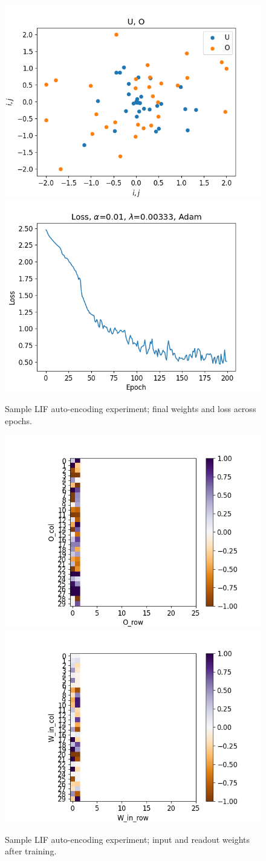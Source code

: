\documentclass[mphil,deptreport,ianc]{infthesis} %
\begin{document}
\begin{figure}[!h]
    \centering
    \includegraphics[width=0.49\columnwidth]{figures/Supplementary/gating/LIF/AutoEncoding/01-04_16-35-37-680/_weights_O_U.png}
    \includegraphics[width=0.49\columnwidth]{figures/Supplementary/gating/LIF/AutoEncoding/01-04_16-35-37-680/plot_loss_test_mt_LIF_et_AutoEncoding_N_30_titers_200.png}
    \caption{Sample LIF auto-encoding experiment; final weights and loss across epochs.}
    \label{fig:LIF_AE_1_w_loss}
\end{figure}

\begin{figure}[!h]
    \centering
    \includegraphics[width=0.49\columnwidth]{figures/Supplementary/gating/LIF/AutoEncoding/01-04_16-35-37-680/test_heatmap_2_O_T.png}
    \includegraphics[width=0.49\columnwidth]{figures/Supplementary/gating/LIF/AutoEncoding/01-04_16-35-37-680/test_heatmap_2_W_in.png}
    \caption{Sample LIF auto-encoding experiment; input and readout weights after training.}
    \label{fig:LIF_AE_1_O_W_in}
\end{figure}
\end{document}
